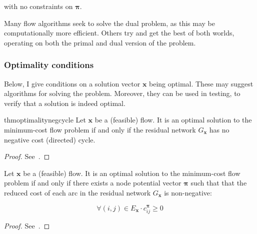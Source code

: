 with no constraints on $\boldsymbol{\pi}$.

Many flow algorithms seek to solve the dual problem, as this may be computationally more efficient. Others try and get the best of both worlds, operating on both the primal and dual version of the problem.

\subsubsection{Optimality conditions} \label{prep:flow-optimality}


Below, I give conditions on a solution vector $\mathbf{x}$ being optimal. These may suggest algorithms for solving the problem. Moreover, they can be used in testing, to verify that a solution is indeed optimal.\\

\begin{restatable}{thm}{optimalitynegcycle}
\label{thm:optimality-neg-cycle}
Let $\mathbf{x}$ be a (feasible) flow. It is an optimal solution to the minimum-cost flow problem if and only if the residual network $G_\mathbf{x}$ has no negative cost (directed) cycle.
\end{restatable}
\begin{proof}
See~\cite[p.~307]{Ahuja:1993}.
\end{proof}

\begin{thm} \label{thm:optimality-reduced-cost}
Let $\mathbf{x}$ be a (feasible) flow. It is an optimal solution to the minimum-cost flow problem if and only if there exists a node potential vector $\boldsymbol{\pi}$ such that that the reduced cost of each arc in the residual network $G_{\mathbf{x}}$ is non-negative:

\begin{equation} \label{eq:optimality-reduced-cost}
\forall(i,j)\in E_{\mathbf{x}}\cdot c_{ij}^{\boldsymbol{\pi}}\geq 0
\end{equation}
\end{thm}
\begin{proof}
See~\cite[p.~309]{Ahuja:1993}.
\end{proof}

